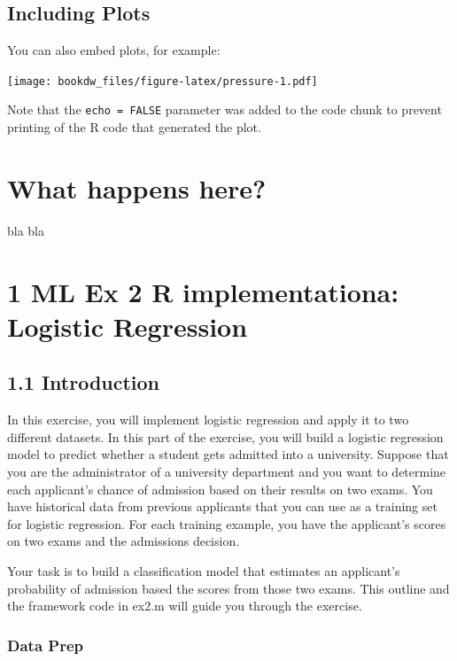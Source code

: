 \documentclass[
]{book}
\begin{document}
\hypertarget{including-plots}{%
\section{Including Plots}\label{including-plots}}

You can also embed plots, for example:

\texttt{[image: bookdw\_files/figure-latex/pressure-1.pdf]}

Note that the \texttt{echo\ =\ FALSE} parameter was added to the code chunk to prevent printing of the R code that generated the plot.

\hypertarget{what-happens-here}{%
\chapter{What happens here?}\label{what-happens-here}}

bla bla

\hypertarget{ml-ex-2-r-implementationa-logistic-regression}{%
\chapter{1 ML Ex 2 R implementationa: Logistic Regression}\label{ml-ex-2-r-implementationa-logistic-regression}}

\hypertarget{introduction}{%
\section{1.1 Introduction}\label{introduction}}

In this exercise, you will implement logistic regression and apply it to two different datasets. In this part of the exercise, you will build a logistic regression model to predict whether a student gets admitted into a university. Suppose that you are the administrator of a university department and you want to determine each applicant's chance of admission based on their results on two exams. You have historical data from previous applicants that you can use as a training set for logistic regression. For each training example, you have the applicant's scores on two exams and the admissions decision.

Your task is to build a classification model that estimates an applicant's probability of admission based the scores from those two exams. This outline and the framework code in ex2.m will guide you through the exercise.

\hypertarget{data-prep}{%
\subsection{Data Prep}\label{data-prep}}
\end{document}
